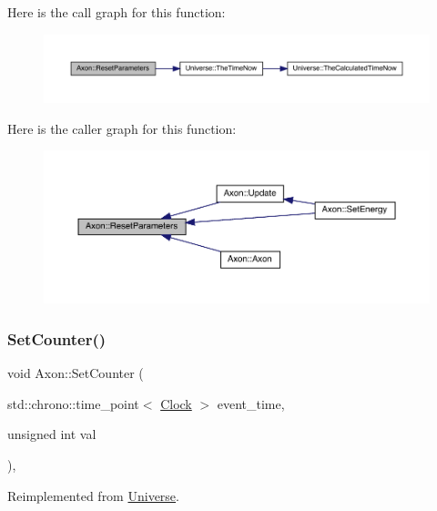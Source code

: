 Here is the call graph for this function\+:
\nopagebreak
\begin{figure}[H]
\begin{center}
\leavevmode
\includegraphics[width=350pt]{class_axon_ae079e0b47f5027625da158930e4fa9c5_cgraph}
\end{center}
\end{figure}
Here is the caller graph for this function\+:
\nopagebreak
\begin{figure}[H]
\begin{center}
\leavevmode
\includegraphics[width=350pt]{class_axon_ae079e0b47f5027625da158930e4fa9c5_icgraph}
\end{center}
\end{figure}
\mbox{\label{class_axon_a3493cb97bde26bd66facc6084cd5f219}} 
\subsubsection{\texorpdfstring{Set\+Counter()}{SetCounter()}}
{\footnotesize\ttfamily void Axon\+::\+Set\+Counter (\begin{DoxyParamCaption}\item[{std\+::chrono\+::time\+\_\+point$<$ \hyperlink{universe_8h_a0ef8d951d1ca5ab3cfaf7ab4c7a6fd80}{Clock} $>$}]{event\+\_\+time,  }\item[{unsigned int}]{val }\end{DoxyParamCaption})\hspace{0.3cm}{\ttfamily [inline]}, {\ttfamily [virtual]}}



Reimplemented from \hyperlink{class_universe_aa22202ae740eb1355529afcb13285e91}{Universe}.



